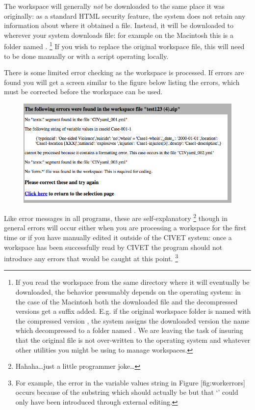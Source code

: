 \documentclass[letterpaper,10pt,english]{sphinxmanual}
\begin{document}
The workspace will generally \emph{not} be downloaded to the same place it
was originally: as a standard HTML security feature, the system does not
retain any information about where it obtained a file. Instead, it will
be downloaded to wherever your system downloads file: for example on the
Macintosh this is a folder named . \footnote{
If you read the workspace from the same directory where it will
eventually be downloaded, the behavior presumably depends on the
operating system: in the case of the Macintosh both the downloaded
file and the decompressed versions get a suffix added. E.g. if the
original workspace folder is named  with the compressed
version , the system assigns the downloaded version
the name  which decompressed to a folder named
. We are leaving the task of insuring that the
original file is not over-written to the operating system and
whatever other utilities you might be using to manage workspaces.
} If you wish to
replace the original workspace file, this will need to be done manually
or with a script operating locally.

There is some limited error checking as the workspace is processed. If
errors are found you will get a screen similar to the figure
below listing the errors, which must be corrected before the
workspace can be used.
\begin{figure}[htbp]
\centering

\includegraphics{workspace_errors.png}
\end{figure}

Like error messages in all programs, these are self-explanatory \footnote{
Hahaha…just a little programmer joke…
}
though in general errors will occur either when you are processing a
workspace for the first time or if you have manually edited it outside
of the CIVET system: once a workspace has been successfully read by
CIVET the program should not introduce any errors that would be caught
at this point. \footnote{
For example, the error in the variable values string in Figure
{[}fig:workerrors{]} occurs because of the substring
 which should actually be
 but that ‘\code{=}’ could only have been
introduced through external editing.
}
\end{document}
